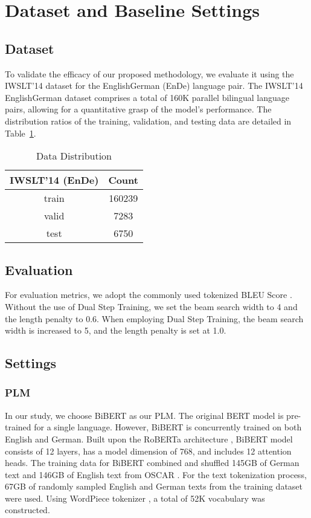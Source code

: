 \documentclass[conference]{IEEEtran}
\begin{document}
\section{Dataset and Baseline Settings}  
\subsection{Dataset}
To validate the efficacy of our proposed methodology, we evaluate it using the IWSLT’14 dataset \cite{cettolo2014iwslt} for the EnglishGerman (EnDe) language pair. The IWSLT'14 EnglishGerman dataset comprises a total of 160K parallel bilingual language pairs, allowing for a quantitative grasp of the model's performance. The distribution ratios of the training, validation, and testing data are detailed in Table~\ref{tab:dataset}. 

\begin{table}[b]
\centering
\caption{Data Distribution}
\label{tab:dataset}
\begin{tabular}{|c|c|}
\hline
\textbf{IWSLT'14 (EnDe)} & \textbf{Count} \\ \hline
train & 160239 \\ 
valid & 7283 \\ 
test & 6750 \\ \hline
\end{tabular}
\end{table}

\subsection{Evaluation}
For evaluation metrics, we adopt the commonly used tokenized BLEU Score \cite{papineni2002bleu}. Without the use of Dual Step Training, we set the beam search width to 4 and the length penalty to 0.6. When employing Dual Step Training, the beam search width is increased to 5, and the length penalty is set at 1.0.
\subsection{Settings}
\subsubsection{PLM}
In our study, we choose BiBERT \cite{xu2021bibert} as our PLM. The original BERT model \cite{devlin2019bert} is pre-trained for a single language. However, BiBERT is concurrently trained on both English and German. Built upon the RoBERTa architecture \cite{Liu2019}, BiBERT model consists of 12 layers, has a model dimension of 768, and includes 12 attention heads. The training data for BiBERT combined and shuffled 145GB of German text and 146GB of English text from OSCAR \cite{suarez2019monolingual}. For the text tokenization process, 67GB of randomly sampled English and German texts from the training dataset were used. Using WordPiece tokenizer \cite{wu2016google}, a total of 52K vocabulary was constructed.
\end{document}
